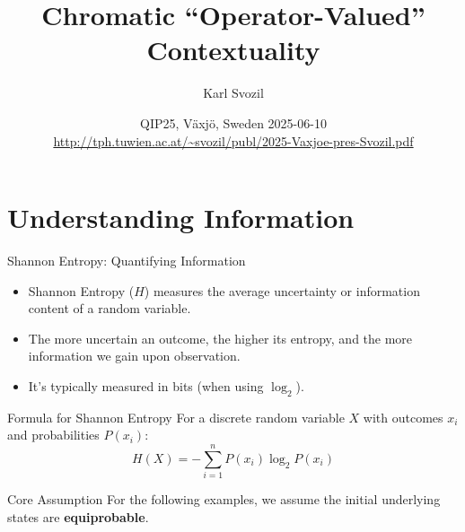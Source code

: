\documentclass{beamer}
\title{Chromatic ``Operator-Valued'' Contextuality}
\author{Karl Svozil}
\institute{Institute for Theoretical Physics, TU Wien, Vienna}
\date{QIP25, V\"axj\"o, Sweden \textbullet{} 2025-06-10\\ $\;$\\
\url{http://tph.tuwien.ac.at/~svozil/publ/2025-Vaxjoe-pres-Svozil.pdf}}
\begin{document}
\begin{frame}
    \titlepage
\end{frame}

\section{Understanding Information}
\begin{frame}{Shannon Entropy: Quantifying Information}
    \begin{itemize}
        \item Shannon Entropy ($H$) measures the \alert{average uncertainty} or \alert{information content} of a random variable.
        \item The more uncertain an outcome, the higher its entropy, and the more information we gain upon observation.
        \item It's typically measured in \alert{bits} (when using $\log_2$).
    \end{itemize}
    \pause
    \begin{block}{Formula for Shannon Entropy}
        For a discrete random variable $X$ with outcomes $x_i$ and probabilities $P(x_i)$:
        \begin{equation*}
            H(X) = -\sum_{i=1}^{n} P(x_i) \log_2 P(x_i)
        \end{equation*}
    \end{block}
    \pause
    \begin{alertblock}{Core Assumption}
        For the following examples, we assume the initial underlying states are \textbf{equiprobable}.
    \end{alertblock}
\end{frame}

\end{document}
